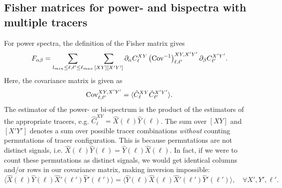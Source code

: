 \documentclass[11pt]{article} %
\DeclareRobustCommand{\Cov}{\ifmmode\text{Cov}\else d\fi}
\newcommand{\br}[1]{\ensuremath{\left( #1 \right)}}
\begin{document}

\subsection{Fisher matrices for power- and bispectra with multiple tracers}
For power spectra, the definition of the Fisher matrix gives 
\begin{equation*}
    F_{\alpha\beta} = \sum_{l_{min}\leq \ell, \ell' \leq \ell_{max}}\sum_{[XY][X'Y']} \partial_\alpha C_{\ell}^{XY} \br{\Cov^{-1}}^{XY, X'Y'}_{\ell, \ell'} \partial_\beta C^{X'Y'}_{\ell'}.
\end{equation*}
Here, the covariance matrix is given as
\begin{equation*}
    \Cov^{XY, X'Y'}_{\ell, \ell'} = \langle \hat C^{XY}_{\ell} \hat C^{X'Y'}_{\ell'} \rangle.
\end{equation*}
The estimator of the power- or bi-spectrum is the product of the estimators of the appropriate tracers, e.g. $\hat C^{XY}_{\ell} = \hat X(\ell) \hat Y(\ell)$. The sum over $[XY]$ and $[X'Y']$ denotes a sum over possible tracer combinations \textit{without} counting permutations of tracer configuration. This is because permutations are not distinct signals, i.e. $\hat X(\ell) \hat Y(\ell) = \hat Y(\ell) \hat X(\ell)$. In fact, if we were to count these permutations as distinct signals, we would get identical columns and/or rows in our covariance matrix, making inversion impossible:
\begin{equation*}
    \langle \hat X(\ell) \hat Y (\ell) \hat X'(\ell') \hat Y' (\ell') \rangle = \langle \hat Y (\ell) \hat X (\ell) \hat X'(\ell') \hat Y' (\ell') \rangle, \quad \forall X', Y', \ell'. 
\end{equation*}
\end{document}
